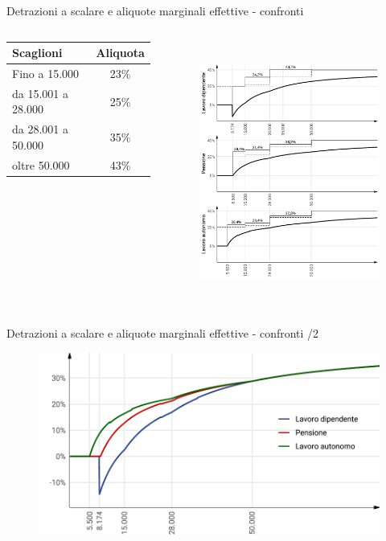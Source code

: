 \documentclass[aspectratio=64,11pt]{beamer}
\newcommand\€{\,\text{€}}
\begin{document}
\begin{frame}{Detrazioni a scalare e aliquote marginali effettive - confronti}
\begin{columns}
\begin{column}{.33\columnwidth}
\scriptsize
\begin{tabular}{lc}
  \toprule
  Scaglioni & Aliquota\\
  \midrule
  Fino a 15.000\€ &23\%\\
  da 15.001 a 28.000\€ &25\%\\
  da 28.001 a 50.000\€ &35\%\\
  oltre 50.000\€ &43\%\\
  \bottomrule                                                       
\end{tabular}
\end{column}

\begin{column}{.66\columnwidth}
\vspace*{-5mm}
\begin{figure}
\centering
\includegraphics[height=8.5cm]{./figure/aliquote-medie-marginali-2022.pdf}
\end{figure}
\end{column}
\end{columns}
\end{frame}


\begin{frame}{Detrazioni a scalare e aliquote marginali effettive - confronti /2}
\begin{figure}
\centering
\includegraphics[height=6cm]{./figure/aliquote-medie-2022-color.pdf}
\end{figure}
\end{frame}
\end{document}
